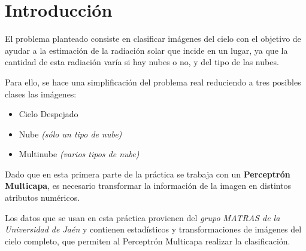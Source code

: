 \documentclass{uc3mpracticas}
\begin{document}
  \frontmatter



  \vspace{55mm}


  \newpage

  \tableofcontents

  \newpage

  \mainmatter

\section{Introducción}

El problema planteado consiste en clasificar imágenes del cielo con el objetivo de ayudar a la estimación de la radiación solar que incide en un lugar, ya que la cantidad de esta radiación varía si hay nubes o no, y del tipo de las nubes.

\vspace{3mm}

Para ello, se hace una simplificación del problema real reduciendo a tres posibles clases las imágenes:

\begin{itemize}
  \item Cielo Despejado
  \item Nube \textit{(sólo un tipo de nube)}
  \item Multinube \textit{(varios tipos de nube)}
\end{itemize}

Dado que en esta primera parte de la práctica se trabaja con un \textbf{Perceptrón Multicapa}, es necesario transformar la información de la imagen en distintos atributos numéricos.

\vspace{3mm}

Los datos que se usan en esta práctica provienen del \textit{grupo MATRAS de la Universidad de Jaén} y contienen estadísticos y transformaciones de imágenes del cielo completo, que permiten al Perceptrón Multicapa realizar la clasificación.
\end{document}

